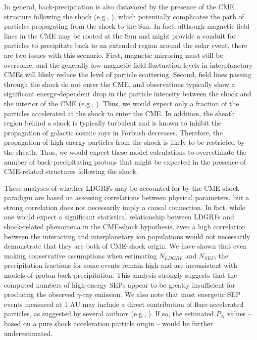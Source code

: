 \documentclass{aastex61}
\begin{document}
In general, back-precipitation is also disfavored by
the presence of the CME structure following the shock (e.g., \citealp{ref:ZURBUCHEN2006}), which potentially complicates the path of particles propagating from the shock to the Sun. In fact, although magnetic field lines in the CME may be rooted at the Sun and might provide a conduit for particles to precipitate back to an extended region around the solar event, there are two issues with this scenario. First, magnetic mirroring must still be overcome, and the generally low magnetic field fluctuation levels in interplanetary CMEs  will likely reduce the level of particle scattering.  Second, field lines passing through the shock do not enter the CME, and observations typically show a significant energy-dependent drop in the particle intensity between the shock and the interior of the CME (e.g., \citealp{ref:SANDERSON2003}).  Thus, we would expect only a fraction of the particles accelerated at the shock to enter the CME.  In addition, the sheath region behind a shock is typically turbulent and is known to inhibit the propagation of galactic cosmic rays in Forbush decreases.  Therefore, the propagation of high energy particles from the shock is likely to be restricted by the sheath.  Thus, we would expect these model calculations to overestimate the number of back-precipitating protons that might be expected in the presence of CME-related structures following the shock.   
    



These analyses of whether LDGRFs may be accounted for by the CME-shock paradigm are based on assessing correlations between physical parameters, but a strong correlation does not necessarily imply a causal connection.  
In fact, while one would expect a significant statistical relationship between LDGRFs and shock-related phenomena in the CME-shock hypothesis, 
even a high correlation between the interacting and interplanetary ion populations would not necessarily demonstrate that they are both of CME-shock origin.
We have shown that even making conservative assumptions when estimating $N_{LDGRF}$ and $N_{SEP}$, the precipitation fractions for some events remain high and are inconsistent with models of proton back precipitation.
This analysis strongly suggests that the computed numbers of high-energy SEPs appear to be greatly insufficient for producing the observed $\gamma$-ray emission. We also note that most energetic SEP events measured at 1 AU may include a direct contribution of flare-accelerated particles, as suggested by several authors (e.g., \citealp{ref:GRECHNEV2008,ref:MCCRACKEN2008,ref:MASSON2009,ref:KAHLER2017,ref:KOCHAROV2020}). If so, 
the estimated $P_{N}$ values -- based on a pure shock acceleration particle origin -- would be further underestimated. 
\end{document}
